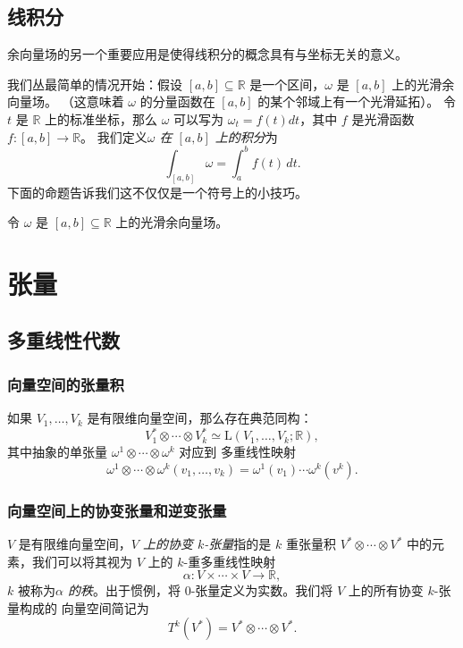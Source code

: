 \documentclass[fontset=none]{Notes}
\newcommand{\LL}{{\mathrm{L}}}
\begin{document}
\section{线积分}

余向量场的另一个重要应用是使得线积分的概念具有与坐标无关的意义。

我们丛最简单的情况开始：假设 $[a,b]\subseteq \mathbb{R}$
是一个区间，$\omega$ 是 $[a,b]$ 上的光滑余向量场。
（这意味着 $\omega$ 的分量函数在 $[a,b]$ 的某个邻域上有一个光滑延拓）。
令 $t$ 是 $\mathbb{R}$ 上的标准坐标，那么 $\omega$ 可以写为
$\omega_t=f(t)dt$，其中 $f$ 是光滑函数 $f:[a,b]\to \mathbb{R}$。
我们定义\emph{$\omega$ 在 $[a,b]$ 上的积分}为
\[
  \int_{[a,b]}\omega=\int_a^b f(t) \, dt.  
\]
下面的命题告诉我们这不仅仅是一个符号上的小技巧。

\begin{proposition}[积分的微分同胚不变性]
  令 $\omega$ 是 $[a,b]\subseteq \mathbb{R}$ 上的光滑余向量场。
  
\end{proposition}



\chapter{张量}

\section{多重线性代数}

\subsection{向量空间的张量积}

\begin{proposition}
  如果 $V_1,\dots,V_k$ 是有限维向量空间，那么存在典范同构：
  \[
    V_1^*\otimes \cdots\otimes V_k^*\simeq \LL(V_1,\dots,V_k;\mathbb{R}),
  \]
  其中抽象的单张量 $\omega^1\otimes \cdots\otimes\omega^k$ 对应到
  多重线性映射
  \[
    \omega^1\otimes\cdots\otimes\omega^k(v_1,\dots,v_k)=
    \omega^1(v_1)\cdots \omega^k(v^k).  
  \]
\end{proposition}

\subsection{向量空间上的协变张量和逆变张量}

$V$ 是有限维向量空间，\emph{$V$ 上的协变 $k$-张量}指的是
$k$ 重张量积 $V^*\otimes\cdots\otimes V^*$ 中的元素，我们可以将其视为
$V$ 上的 $k$-重多重线性映射
\[
  \alpha:V\times\cdots\times V\to \mathbb{R},
\]
$k$ 被称为\emph{$\alpha$ 的秩}。出于惯例，将 $0$-张量定义为实数。我们将 $V$ 上的所有协变 $k$-张量构成的
向量空间简记为
\[
  T^k(V^*)=V^*\otimes\cdots\otimes V^*.
\]
\end{document}
